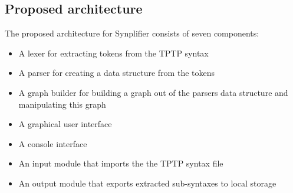 \subsection{Proposed architecture}\label{sec:ConceptProposedArchitecture}
The proposed architecture for \ac{Synplifier} consists of seven components:
\begin{itemize}
\item A lexer for extracting tokens from the \ac{TPTP} syntax
\item A parser for creating a data structure from the tokens
\item A graph builder for building a graph out of the parsers data structure and manipulating this graph
\item A graphical user interface
\item A console interface 
\item An input module that imports the the \ac{TPTP} syntax file
\item An output module that exports extracted sub-syntaxes to local storage
\end{itemize}


